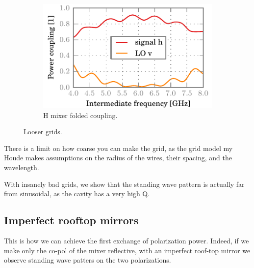 \begin{figure}[hbtp]
    \\
    \begin{subfigure}[b]{.5\textwidth}
        \includegraphics{chapter_3/07_looser_h_ssb}%
        \caption{H mixer folded coupling.}
    \end{subfigure}%
    \caption{Looser grids.}
    \label{fig:07_looser}
\end{figure}

There is a limit on how coarse you can make the grid, as the grid model my Houde makes assumptions on the radius of the wires, their spacing, and the wavelength.

With insanely bad grids, we show that the standing wave pattern is actually far from sinusoidal, as the cavity has a very high Q.

\clearpage
\subsection{Imperfect rooftop mirrors}
This is how we can achieve the first exchange of polarization power.
Indeed, if we make only the co-pol of the mixer reflective, with an imperfect roof-top mirror we observe standing wave patters on the two polarizations.

